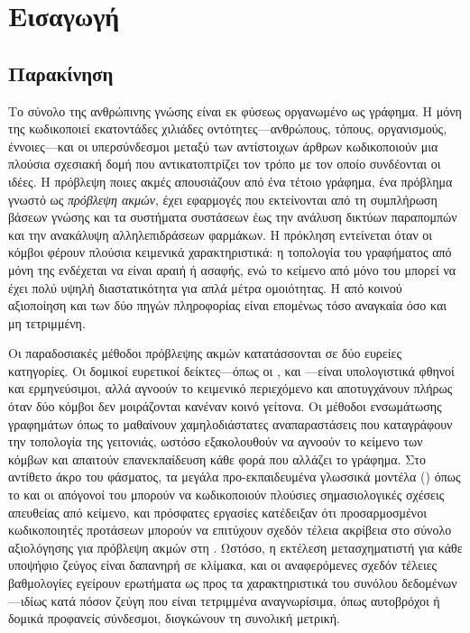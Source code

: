 

\chapter{Εισαγωγή}
\label{ch:introduction}


\section{Παρακίνηση}
\label{sec:motivation}

Το σύνολο της ανθρώπινης γνώσης είναι εκ φύσεως οργανωμένο ως γράφημα.
Η
 μόνη της κωδικοποιεί εκατοντάδες χιλιάδες οντότητες---ανθρώπους,
τόπους, οργανισμούς, έννοιες---και οι υπερσύνδεσμοι μεταξύ των αντίστοιχων άρθρων
κωδικοποιούν μια πλούσια σχεσιακή δομή που αντικατοπτρίζει τον τρόπο με τον οποίο
συνδέονται οι ιδέες.
Η πρόβλεψη ποιες ακμές απουσιάζουν από ένα τέτοιο γράφημα, ένα
πρόβλημα γνωστό ως \textit{πρόβλεψη ακμών}, έχει εφαρμογές που εκτείνονται από τη
συμπλήρωση βάσεων γνώσης και τα συστήματα συστάσεων έως την ανάλυση δικτύων
παραπομπών και την ανακάλυψη αλληλεπιδράσεων φαρμάκων.
Η πρόκληση εντείνεται όταν οι
κόμβοι φέρουν πλούσια κειμενικά χαρακτηριστικά: η τοπολογία του γραφήματος από μόνη της
ενδέχεται να είναι αραιή ή ασαφής, ενώ το κείμενο από μόνο του μπορεί να έχει πολύ
υψηλή διαστατικότητα για απλά μέτρα ομοιότητας.
Η από κοινού αξιοποίηση και των δύο
πηγών πληροφορίας είναι επομένως τόσο αναγκαία όσο και μη τετριμμένη.

Οι παραδοσιακές μέθοδοι πρόβλεψης ακμών κατατάσσονται σε δύο ευρείες κατηγορίες.
Οι
δομικοί ευρετικοί δείκτες---όπως οι ,  και
---είναι υπολογιστικά φθηνοί και ερμηνεύσιμοι, αλλά
αγνοούν το κειμενικό περιεχόμενο και αποτυγχάνουν πλήρως όταν δύο κόμβοι δεν
μοιράζονται κανέναν κοινό γείτονα.
Οι μέθοδοι ενσωμάτωσης γραφημάτων όπως το
 \cite{grover2016node2vec} μαθαίνουν χαμηλοδιάστατες αναπαραστάσεις που
καταγράφουν την τοπολογία της γειτονιάς, ωστόσο εξακολουθούν να αγνοούν το κείμενο
των κόμβων και απαιτούν επανεκπαίδευση κάθε φορά που αλλάζει το γράφημα.
Στο αντίθετο
άκρο του φάσματος, τα μεγάλα προ-εκπαιδευμένα γλωσσικά μοντέλα () όπως το
 \cite{devlin2019bert} και οι απόγονοί του μπορούν να κωδικοποιούν πλούσιες
σημασιολογικές σχέσεις απευθείας από κείμενο, και πρόσφατες εργασίες κατέδειξαν ότι
προσαρμοσμένοι κωδικοποιητές προτάσεων μπορούν να επιτύχουν σχεδόν τέλεια ακρίβεια
στο σύνολο αξιολόγησης  για πρόβλεψη ακμών στη 
\cite{phan2023link,tran2023text}.
Ωστόσο, η εκτέλεση μετασχηματιστή για κάθε
υποψήφιο ζεύγος είναι δαπανηρή σε κλίμακα, και οι αναφερόμενες σχεδόν τέλειες
βαθμολογίες εγείρουν ερωτήματα ως προς τα χαρακτηριστικά του συνόλου δεδομένων---ιδίως
κατά πόσον ζεύγη που είναι τετριμμένα αναγνωρίσιμα, όπως αυτοβρόχοι ή δομικά
προφανείς σύνδεσμοι, διογκώνουν τη συνολική μετρική.

